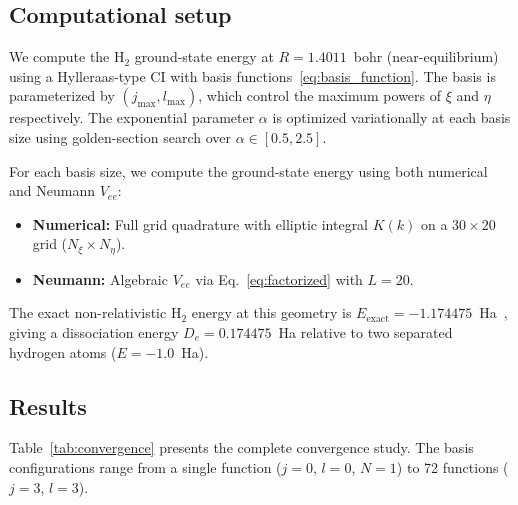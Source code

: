 \documentclass[aps,pra,twocolumn,superscriptaddress,longbibliography]{revtex4-2}
\begin{document}
\subsection{Computational setup}

We compute the H$_2$ ground-state energy at $R = 1.4011$~bohr
(near-equilibrium) using a Hylleraas-type CI with basis
functions~\eqref{eq:basis_function}.  The basis is parameterized
by $(j_{\max}, l_{\max})$, which control the maximum powers
of $\xi$ and $\eta$ respectively.  The exponential parameter
$\alpha$ is optimized variationally at each basis size using
golden-section search over $\alpha \in [0.5, 2.5]$.

For each basis size, we compute the ground-state energy using
both numerical and Neumann $V_{ee}$:
\begin{itemize}
  \item \textbf{Numerical:} Full grid quadrature with elliptic
    integral $K(k)$ on a $30 \times 20$ grid ($N_\xi \times N_\eta$).
  \item \textbf{Neumann:} Algebraic $V_{ee}$ via
    Eq.~\eqref{eq:factorized} with $L = 20$.
\end{itemize}

The exact non-relativistic H$_2$ energy at this geometry is
$E_{\mathrm{exact}} = -1.174475$~Ha~\cite{Kolos1968}, giving
a dissociation energy $D_e = 0.174475$~Ha relative to two
separated hydrogen atoms ($E = -1.0$~Ha).

\subsection{Results}

Table~\ref{tab:convergence} presents the complete convergence
study.  The basis configurations range from a single function
($j = 0$, $l = 0$, $N = 1$) to 72 functions ($j = 3$, $l = 3$).
\end{document}
